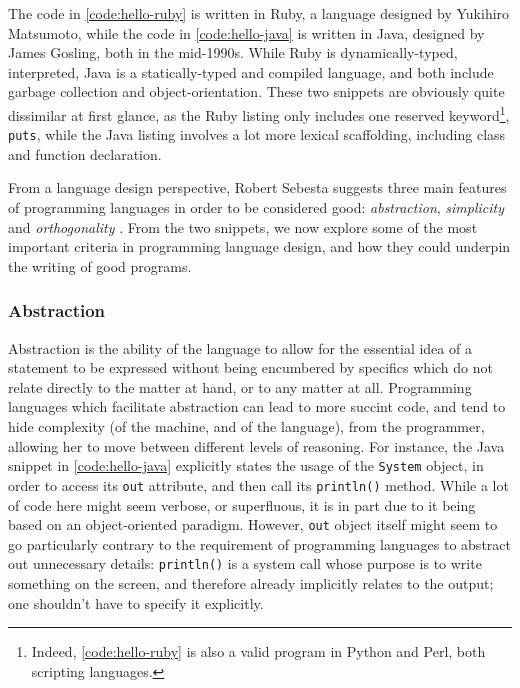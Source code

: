 The code in \autoref{code:hello-ruby} is written in Ruby, a language designed by Yukihiro Matsumoto, while the code in \autoref{code:hello-java} is written in Java, designed by James Gosling, both in the mid-1990s. While Ruby is dynamically-typed, interpreted, Java is a statically-typed and compiled language, and both include garbage collection and object-orientation. These two snippets are obviously quite dissimilar at first glance, as the Ruby listing only includes one reserved keyword\footnote{Indeed, \autoref{code:hello-ruby} is also a valid program in Python and Perl, both scripting languages.}, \lstinline{puts}, while the Java listing involves a lot more lexical scaffolding, including class and function declaration.

From a language design perspective, Robert Sebesta suggests three main features of programming languages in order to be considered good: \emph{abstraction}, \emph{simplicity} and \emph{orthogonality} \citep{sebesta_concepts_2018}. From the two snippets, we now explore some of the most important criteria in programming language design, and how they could underpin the writing of good programs.

\subsubsection{Abstraction}
\label{subsubsec:programming-abstraction}

Abstraction is the ability of the language to allow for the essential idea of a statement to be expressed without being encumbered by specifics which do not relate directly to the matter at hand, or to any matter at all. Programming languages which facilitate abstraction can lead to more succint code, and tend to hide complexity (of the machine, and of the language), from the programmer, allowing her to move between different levels of reasoning. For instance, the Java snippet in \autoref{code:hello-java} explicitly states the usage of the \lstinline{System} object, in order to access its \lstinline{out} attribute, and then call its \lstinline{println()} method. While a lot of code here might seem verbose, or superfluous, it is in part due to it being based on an object-oriented paradigm. However, \lstinline{out} object itself might seem to go particularly contrary to the requirement of programming languages to abstract out unnecessary details: \lstinline{println()} is a system call whose purpose is to write something on the screen, and therefore already implicitly relates to the output; one shouldn't have to specify it explicitly.

